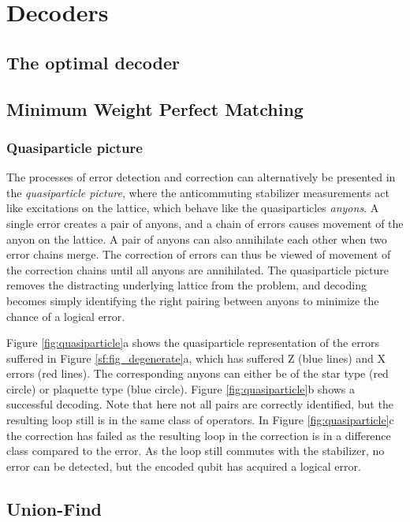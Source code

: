 \chapter{Decoders}\label{sec:surface_decoders}
\section{The optimal decoder}\label{sec:optimal_decoder}
\section{Minimum Weight Perfect Matching}\label{sec:MWPMdecoder}

\subsection{Quasiparticle picture}
The processes of error detection and correction can alternatively be presented in the \emph{quasiparticle picture}, where the anticommuting stabilizer measurements act like excitations on the lattice, which behave like the quasiparticles \emph{anyons}. A single error creates a pair of anyons, and a chain of errors causes movement of the anyon on the lattice. A pair of anyons can also annihilate each other when two error chains merge. The correction of errors can thus be viewed of movement of the correction chains until all anyons are annihilated. The quasiparticle picture removes the distracting underlying lattice from the problem, and decoding becomes simply identifying the right pairing between anyons to minimize the chance of a logical error.

Figure \ref{fig:quasiparticle}a shows the quasiparticle representation of the errors suffered in Figure \ref{sf:fig_degenerate}a, which has suffered Z (blue lines) and X errors (red lines). The corresponding anyons can either be of the star type (red circle) or plaquette type (blue circle). Figure \ref{fig:quasiparticle}b shows a successful decoding. Note that here not all pairs are correctly identified, but the resulting loop still is in the same class of operators. In Figure \ref{fig:quasiparticle}c the correction has failed as the resulting loop in the correction is in a difference class compared to the error. As the loop still commutes with the stabilizer, no error can be detected, but the encoded qubit has acquired a logical error.


\section{Union-Find}\label{sec:UFdecoder}

